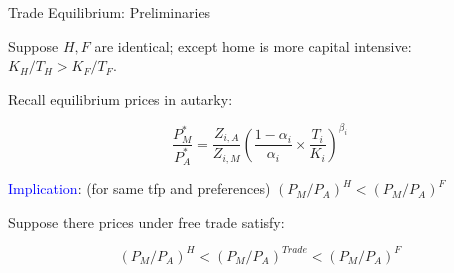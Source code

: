 \documentclass[notes,11pt, aspectratio=169, xcolor=table]{beamer}
\newcommand{\blue}[1]{\textcolor{blue}{#1}}
\newenvironment{wideitemize}{\itemize\addtolength{\itemsep}{10pt}}{\enditemize}
\begin{document}
\begin{frame}{Trade Equilibrium: Preliminaries}
\begin{wideitemize}
    \item Suppose $H,F$ are identical; except home is more capital intensive: $K_H/T_H > K_F/T_F$.

    \item Recall equilibrium prices in autarky:

    \begin{equation*}
         \frac{P_{M}^*}{P_{A}^*} =  \frac{Z_{i,A}}{Z_{i,M}} \left( \frac{1-\alpha_i}{\alpha_i} \times \frac{T_i}{K_i} \right)^{\beta_i}
    \end{equation*}

    \item \blue{Implication}: (for same tfp and preferences) $(P_{M}/P_{A})^{H} < (P_{M}/P_{A})^{F}$

    \item Suppose there prices under free trade satisfy:

    \begin{equation*}
        (P_{M}/P_{A})^{H} < (P_{M}/P_{A})^{Trade} < (P_{M}/P_{A})^{F}
    \end{equation*}
        
    
    
\end{wideitemize}
\end{frame}
\end{document}
